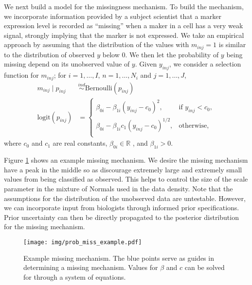 \documentclass[12pt,]{article}
\newcommand{\p}[1]{\left(#1\right)}
\newcommand{\ind}{\overset{ind}{\sim}}
\def\logit{\text{logit}}
\def\Bern{\text{Bernoulli}}
\def\Prob{\text{Pr}}
\begin{document}
We next build a model for the missingness mechanism.
To build the mechanism, we incorporate information provided by a subject
scientist that a marker expression level is recorded as ``missing'' when a
maker in a cell has a very weak signal, strongly implying that the marker is
not expressed.
We take an empirical approach by assuming that the distribution of the values
with $m_{inj}=1$ is similar to the distribution of observed $y$ below 0. We
then let the probability of $y$ being missing depend on its unobserved value of
$y$.
%
Given
\(y_{inj}\), we consider a selection function for \(m_{inj}\); for
\(i=1, \ldots, I\), \(n=1, \ldots, N_i\) and \(j=1, \ldots, J\),
\begin{align}
  m_{inj} \mid p_{inj} &\ind \Bern(p_{inj}) \label{eq:missing} \\
  \logit(p_{inj}) &= \begin{cases}
  \beta_{0i} - \beta_{1i}(y_{inj}-c_0)^2, & \text{if } y_{inj} < c_0\nonumber, \\
  \beta_{0i} - \beta_{1i}c_1\p{y_{inj}-c_0}^{1/2}, & \text{otherwise}, \nonumber \\
  \end{cases} 
\end{align}
where \(c_0\) and \(c_1\) are real constants, $\beta_{0i} \in \mathbb{R}$ , and
$\beta_{1i} > 0$.

Figure \ref{fig:prob-miss-eg} shows an example missing mechanism. We desire the
missing mechanism have a peak in the middle so as discourage extremely large
and extremely small values from being classified as observed. This helps to
control the size of the scale parameter in the mixture of Normals used in the
data density. Note that the assumptions for the distribution of the unobserved data are
untestable. However, we can incorporate input from biologists through informed
prior specifications. Prior uncertainty can then be directly propagated to the
posterior distribution for the missing mechanism.

\begin{figure}[th!]
\begin{center}
\texttt{[image: img/prob\_miss\_example.pdf]}
\caption{Example missing mechanism. The blue points serve as guides in
determining a missing mechanism. Values for $\beta$ and $c$ can be solved for
through a system of equations.}
\label{fig:prob-miss-eg}
\end{center}
\end{figure}
\end{document}
